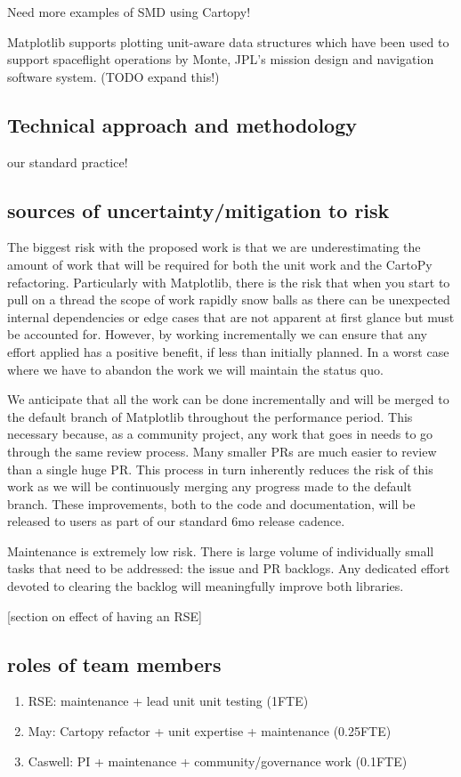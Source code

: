 \documentclass[12pt]{article}
\numberwithin{page}{section}
\begin{document}
Need more examples of SMD using Cartopy!

Matplotlib supports plotting unit-aware data structures which have
been used to support spaceflight operations by Monte, JPL's mission
design and navigation software system. (TODO expand this!)

\subsection{Technical approach and methodology}

our standard practice!

\subsection{sources of uncertainty/mitigation to risk}

The biggest risk with the proposed work is that we are underestimating
the amount of work that will be required for both the unit work and
the CartoPy refactoring.  Particularly with Matplotlib, there is the
risk that when you start to pull on a thread the scope of work rapidly
snow balls as there can be unexpected internal dependencies or edge
cases that are not apparent at first glance but must be accounted for.
However, by working incrementally we can ensure that any effort
applied has a positive benefit, if less than initially planned.  In a
worst case where we have to abandon the work we will maintain the
status quo.

We anticipate that all the work can be done incrementally and will be
merged to the default branch of Matplotlib throughout the performance
period.  This necessary because, as a community project, any work that
goes in needs to go through the same review process.  Many smaller PRs
are much easier to review than a single huge PR.  This process in turn
inherently reduces the risk of this work as we will be continuously
merging any progress made to the default branch.  These improvements,
both to the code and documentation, will be released to users as part
of our standard 6mo release cadence.

Maintenance is extremely low risk.  There is large volume of
individually small tasks that need to be addressed: the issue and PR backlogs.
Any dedicated effort devoted to clearing the backlog will meaningfully improve
both libraries.

[section on effect of having an RSE]

\subsection{roles of team members}
\begin{enumerate}
\item RSE: maintenance + lead unit unit testing (1FTE)
\item May: Cartopy refactor + unit expertise + maintenance (0.25FTE)
\item Caswell: PI + maintenance + community/governance work (0.1FTE)
\end{enumerate}
\end{document}
